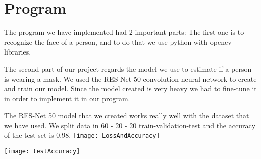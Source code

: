 \section{Program} 
The program we have implemented had 2 important parts: 
The first one is to recognize the face of a person, and to do that we use python with opencv libraries.

The second part of our project regards the model we use to estimate if a person is wearing a mask. We used the RES-Net 50 convolution neural network to create and train our model. Since the model created is very heavy we had to fine-tune it in order to implement it in our program.

The RES-Net 50 model that we created works really well with the dataset that we have used. We split data in 60 - 20 - 20 train-validation-test and the accuracy of the test set is 0.98.
\texttt{[image: LossAndAccuracy]}

\texttt{[image: testAccuracy]}